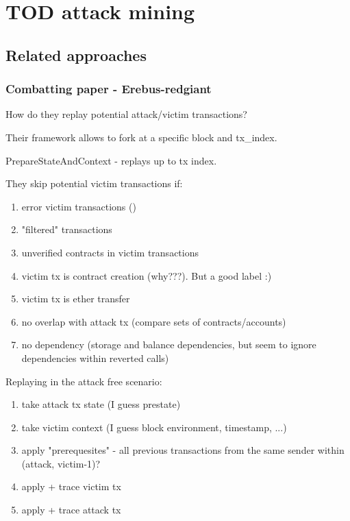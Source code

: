 \documentclass[draft,final]{vutinfth} %
\begin{document}
\chapter{TOD attack mining}

\section{Related approaches}

\subsection{Combatting paper - Erebus-redgiant}

How do they replay potential attack/victim transactions?

Their framework allows to fork at a specific block and tx\_index.

PrepareStateAndContext - replays up to tx index.


They skip potential victim transactions if:

\begin{enumerate}
    \item error victim transactions ()
    \item "filtered" transactions 
    \item unverified contracts in victim transactions
    \item victim tx is contract creation (why???). But a good label :)
    \item victim tx is ether transfer
    \item no overlap with attack tx (compare sets of contracts/accounts)
    \item no dependency (storage and balance dependencies, but seem to ignore dependencies within reverted calls)
\end{enumerate}

Replaying in the attack free scenario:

\begin{enumerate}
    \item take attack tx state (I guess prestate)
    \item take victim context (I guess block environment, timestamp, ...)
    \item apply "prerequesites" - all previous transactions from the same sender within (attack, victim-1)?
    \item apply + trace victim tx
    \item apply + trace attack tx
\end{enumerate}
\end{document}
